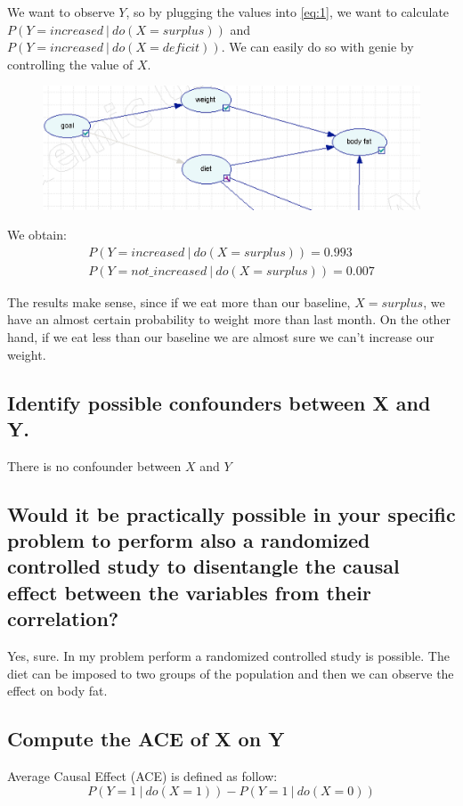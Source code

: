 \documentclass[11pt]{article}
\newcommand\given[1][]{\:#1\vert\:}
\begin{document}
We want to observe $Y$, so by plugging the values into \ref{eq:1}, we want to calculate
$P(Y=increased \given do(X=surplus))$ and $P(Y=increased \given do(X=deficit))$. We can easily do so with genie by controlling the value of $X$.

\begin{figure}[H]
\includegraphics[width=\textwidth]{images/control_value/1}
\end{figure}

We obtain:
\begin{align}
P(Y=increased \given do(X=surplus)) = 0.993 \\
P(Y=not\_increased \given do(X=surplus)) = 0.007
\end{align}

The results make sense, since if we eat more than our baseline, $X=surplus$, we have an almost certain probability to weight more than last month. On the other hand, if we eat less than our baseline we are almost sure we can't increase our weight.

\subsection{Identify possible confounders between X and Y.}
There is no confounder between $X$ and $Y$
\subsection{Would it be practically possible in your specific problem to perform also a randomized controlled study to disentangle the causal effect between the variables from their correlation?
}
Yes, sure. In my problem perform a randomized controlled study is possible. The diet can be imposed to two groups of the population and then we can observe the effect on body fat.

\subsection{Compute the ACE of X on Y}
Average Causal Effect (ACE) is defined as follow:
\begin{equation}
P(Y=1 \given do(X=1)) - P(Y=1 \given do(X=0)) 
\label{eq: ace}
\end{equation}
\end{document}

